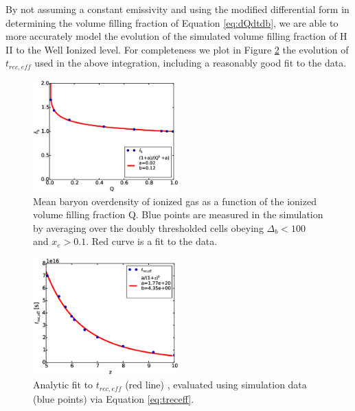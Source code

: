 By not assuming a constant emissivity and using the modified differential form in determining the volume filling fraction of Equation \eqref{eq:dQdtdb}, we are able to more accurately model the evolution of the simulated volume filling fraction of H {\footnotesize II} to the Well Ionized level. For completeness we plot in Figure \ref{treceffvszfit} the evolution of $t_{rec,eff}$ used in the above integration, including a reasonably good fit to the data. 


\begin{figure}
	\includegraphics[width=0.5\textwidth]{deltabvsQfit5.eps}
	\caption{Mean baryon overdensity of ionized gas as a function of the ionized volume filling fraction Q. Blue points are measured in the simulation by averaging over the doubly thresholded cells obeying $\Delta_b<100$ and $x_e > 0.1$. Red curve is a fit to the data.}
	\label{deltabvsQfit5}
\end{figure}

\begin{figure}
	\includegraphics[width=0.5\textwidth]{treceffvszfit.eps}
	\caption{Analytic fit to $t_{rec,eff}$ (red line) , evaluated using simulation data (blue points) via Equation \eqref{eq:treceff}.}
	\label{treceffvszfit}
\end{figure}

